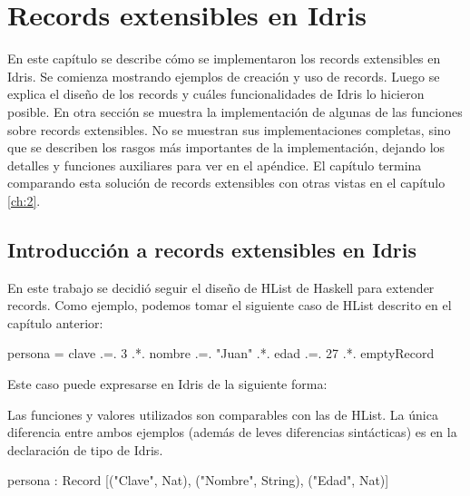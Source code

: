 
\chapter{Records extensibles en Idris}
\label{ch:3}

En este capítulo se describe cómo se implementaron los records extensibles en Idris. Se comienza mostrando ejemplos de creación y uso de records. Luego se explica el diseño de los records y cuáles funcionalidades de Idris lo hicieron posible. En otra sección se muestra la implementación de algunas de las funciones sobre records extensibles. No se muestran sus implementaciones completas, sino que se describen los rasgos más importantes de la implementación, dejando los detalles y funciones auxiliares para ver en el apéndice. El capítulo termina comparando esta solución de records extensibles con otras vistas en el capítulo \ref{ch:2}.

\section{Introducción a records extensibles en Idris}

En este trabajo se decidió seguir el diseño de HList de Haskell para extender records. Como ejemplo, podemos tomar el siguiente caso de HList descrito en el capítulo anterior:

\begin{code}
persona = clave .=. 3
  .*. nombre .=. "Juan"
  .*. edad .=. 27
  .*. emptyRecord
\end{code}

Este caso puede expresarse en Idris de la siguiente forma:


Las funciones y valores utilizados son comparables con las de HList. La única diferencia entre ambos ejemplos (además de leves diferencias sintácticas) es en la declaración de tipo de Idris.

\begin{code}
persona : Record [("Clave", Nat), ("Nombre", String),
  ("Edad", Nat)]
\end{code}


